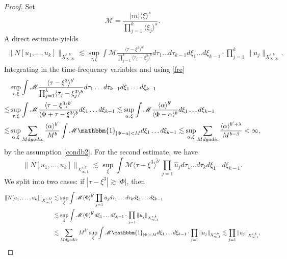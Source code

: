 \documentclass[a4paper, 11pt]{amsart}
\newcommand{\jap}[1]{\langle #1 \rangle}
\theoremstyle{plain}
\theoremstyle{definition}
\theoremstyle{remark}
\newcommand{\5}{\text{V}}
\numberwithin{equation}{section}
\theoremstyle{mytheoremstyle} \newtheorem{nota}[thm]{Remark}
\theoremstyle{mytheoremstyle} \newtheorem{exemplo}[thm]{Example}
\begin{document}
\begin{proof}
Set
$$
\mathcal{M}=\frac{|m|\jap{\xi}^s}{\prod_{j=1}^k\jap{\xi_j}^s}.
$$
A direct estimate yields
    \begin{align}
        \|N[u_1,\dots, u_k] \|_{X^{s,b'}_{\infty, \infty}} \lesssim \sup_{\tau,\xi} \int \mathcal{M}\frac{\jap{\tau-\xi^3}^{b'}}{\prod_{j=1}^k\jap{\tau_j-\xi_j^3}^b } d\tau_1\dots d\tau_{k-1}d\xi_1\dots d\xi_{k-1} \cdot \prod_{j=1}^k \|u_j\|_{X^{s,b}_{\infty,\infty}}.
    \end{align}
    Integrating in the time-frequency variables and using \eqref{fre}
    \begin{align}
        &\sup_{\tau,\xi} \int \mathcal{M}\frac{\jap{\tau-\xi^3}^{b'}}{\prod_{j=1}^k\jap{\tau_j-\xi_j^3}^b } d\tau_1\dots d\tau_{k-1}d\xi_1\dots d\xi_{k-1} \\ \lesssim & \sup_{\tau,\xi} \int \mathcal{M} \frac{\jap{\tau-\xi^3}^{b'}}{\jap{\Phi+\tau-\xi^3}^b}d\xi_1\dots d\xi_{k-1} \lesssim \sup_{\alpha,\xi} \int \mathcal{M} \frac{\jap{\alpha}^{b'}}{\jap{\Phi-\alpha}^b}d\xi_1\dots d\xi_{k-1} \\ \lesssim &\sup_{\alpha,\xi}\sum_{M dyadic} \frac{\jap{\alpha}^{b'}}{M^b}\int \mathcal{M}\mathbbm{1}_{|\Phi-\alpha|<M} d\xi_1\dots d\xi_{k-1} \lesssim \sup_{\alpha,\xi}\sum_{M dyadic} \frac{\jap{\alpha}^{b'+\lambda}}{M^{b-\beta}} <\infty,
    \end{align}
    by the assumption \eqref{condb2}. For the second estimate, we have
    \begin{equation}
        \|N[u_1,\dots,u_k]\|_{X^{s,\tilde{b}'}_{\infty,1}} \lesssim \sup_\xi \int \mathcal{M} \jap{\tau-\xi^3}^{\tilde{b}'} \prod_{j=1} \hat{u}_j d\tau_1\dots d\tau_k d\xi_1\dots d\xi_{k-1}.
    \end{equation}
    We split into two cases: if $|\tau-\xi^3|\gtrsim |\Phi|$, then
     \begin{align}
        \|N[u_1,\dots,u_k]\|_{X^{s,\tilde{b}'}_{\infty,1}} &\lesssim \sup_\xi \int \mathcal{M} \jap{\Phi}^{\tilde{b}'} \prod_{j=1} \hat{u}_j d\tau_1\dots d\tau_k d\xi_1\dots d\xi_{k-1} \\&\lesssim \sup_\xi \int \mathcal{M} \jap{\Phi}^{\tilde{b}'} d\xi_1\dots d\xi_{k-1} \cdot \prod_{j=1} \|u_j\|_{X^{s,\tilde{b}}_{\infty,1}} \\&\lesssim \sum_{M dyadic} M^{\tilde{b}'} \sup_\xi \int \mathcal{M} \mathbbm{1}_{|\Phi|<M} d\xi_1\dots d\xi_{k-1} \cdot \prod_{j=1} \|u_j\|_{X^{s,b}_{\infty,1}} \lesssim \prod_{j=1} \|u_j\|_{X^{s,\tilde{b}}_{\infty,1}},
    \end{align}

\end{proof}
\end{document}
